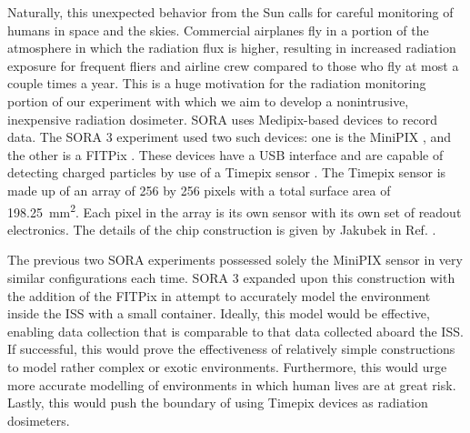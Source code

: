 Naturally, this unexpected behavior from the Sun calls for careful monitoring of humans in space and the skies.
Commercial airplanes fly in a portion of the atmosphere in which the radiation flux is higher, resulting in increased radiation exposure for frequent fliers and airline crew compared to those who fly at most a couple times a year. 
This is a huge motivation for the radiation monitoring portion of our experiment with which we aim to develop a nonintrusive, inexpensive radiation dosimeter.
SORA uses Medipix-based \cite{Medipix} devices to record data.
The SORA 3 experiment used two such devices: one is the MiniPIX \cite{MiniPIX-ADVACAM}, and the other is a FITPix \cite{FITPix}.
These devices have a USB interface and are capable of detecting charged particles by use of a Timepix sensor \cite{Timepix}.
The Timepix sensor is made up of an array of 256 by 256 pixels with a total surface area of \SI{198.25}{\milli\meter\squared}.
Each pixel in the array is its own sensor with its own set of readout electronics.
The details of the chip construction is given by Jakubek in Ref. \cite{Jakubek-Pixel-Detectors}.

The previous two SORA experiments possessed solely the MiniPIX sensor in very similar configurations each time.
SORA 3 expanded upon this construction with the addition of the FITPix in attempt to accurately model the environment inside the ISS with a small container.
Ideally, this model would be effective, enabling data collection that is comparable to that data collected aboard the ISS.
If successful, this would prove the effectiveness of relatively simple constructions to model rather complex or exotic environments.
Furthermore, this would urge more accurate modelling of environments in which human lives are at great risk.
Lastly, this would push the boundary of using Timepix devices as radiation dosimeters.

